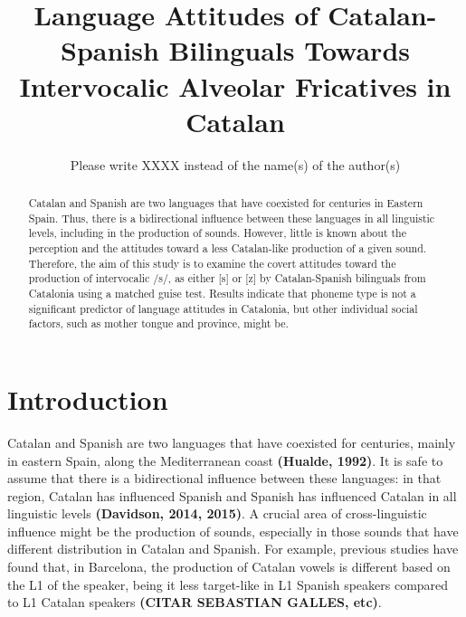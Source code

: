\documentclass[
  a4paper,
  11pt,
  twocolumn]{article}
\author{}
\date{\vspace{-2.5em}}
\begin{document}
\title{Language Attitudes of Catalan-Spanish Bilinguals Towards Intervocalic Alveolar Fricatives in Catalan}
\author{Please write XXXX instead of the name(s) of the author(s)}


\maketitle

\begin{abstract}
Catalan and Spanish are two languages that have coexisted for centuries in Eastern Spain. Thus, there is a bidirectional influence between these languages in all linguistic levels, including in the production of sounds. However, little is known about the perception and the attitudes toward a less Catalan-like production of a given sound. Therefore, the aim of this study is to examine the covert attitudes toward the production of intervocalic /s/, as either [s] or [z] by Catalan-Spanish bilinguals from Catalonia using a matched guise test. Results indicate that phoneme type is not a significant predictor of language attitudes in Catalonia, but other individual social factors, such as mother tongue and province, might be.
\end{abstract}



\section{Introduction}

Catalan and Spanish are two languages that have coexisted for centuries,
mainly in eastern Spain, along the Mediterranean coast \textbf{(Hualde,
1992)}. It is safe to assume that there is a bidirectional influence
between these languages: in that region, Catalan has influenced Spanish
and Spanish has influenced Catalan in all linguistic levels
\textbf{(Davidson, 2014, 2015)}. A crucial area of cross-linguistic
influence might be the production of sounds, especially in those sounds
that have different distribution in Catalan and Spanish. For example,
previous studies have found that, in Barcelona, the production of
Catalan vowels is different based on the L1 of the speaker, being it
less target-like in L1 Spanish speakers compared to L1 Catalan speakers
\textbf{(CITAR SEBASTIAN GALLES, etc)}.
\end{document}
